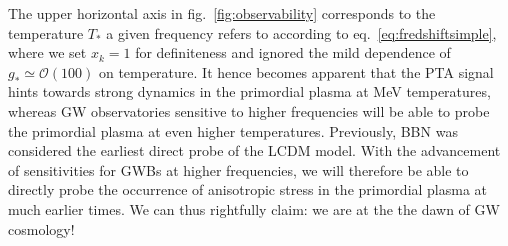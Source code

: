 The upper horizontal axis in fig.~\ref{fig:observability} corresponds to the temperature $T_*$ a given frequency refers to according to eq.~\eqref{eq:fredshiftsimple}, where we set $x_k = 1$ for definiteness and ignored the mild dependence of $g_* \simeq \mathcal{O}(100)$ on temperature. It hence becomes apparent that the \ac{PTA} signal hints towards strong dynamics in the primordial plasma at MeV temperatures,  whereas \ac{GW} observatories sensitive to higher frequencies will be able to probe the primordial plasma at even higher temperatures. Previously, \ac{BBN} was considered the earliest direct probe of the \ac{LCDM} model. With the advancement of sensitivities for \acp{GWB} at higher frequencies, we will therefore be able to directly probe the occurrence of anisotropic stress in the primordial plasma at much earlier times. We can thus rightfully claim: we are at the the dawn of \ac{GW} cosmology!